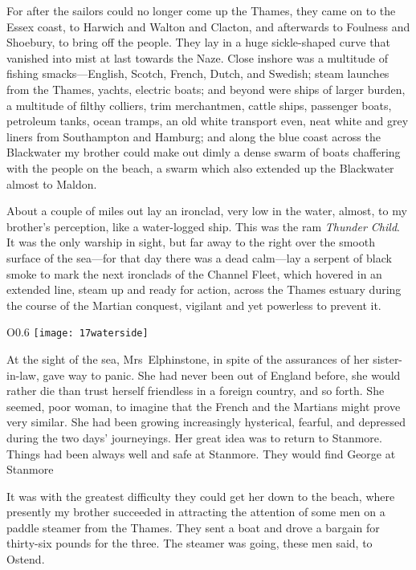 For after the sailors could no longer come up the Thames, they came on to the Essex coast, to Harwich and Walton and Clacton, and afterwards to Foulness and Shoebury, to bring off the people. They lay in a huge sickle-shaped curve that vanished into mist at last towards the Naze. Close inshore was a multitude of fishing smacks—English, Scotch, French, Dutch, and Swedish; steam launches from the Thames, yachts, electric boats; and beyond were ships of larger burden, a multitude of filthy colliers, trim merchantmen, cattle ships, passenger boats, petroleum tanks, ocean tramps, an old white transport even, neat white and grey liners from Southampton and Hamburg; and along the blue coast across the Blackwater my brother could make out dimly a dense swarm of boats chaffering with the people on the beach, a swarm which also extended up the Blackwater almost to Maldon.

About a couple of miles out lay an ironclad, very low in the water, almost, to my brother's perception, like a water-logged ship. This was the ram \textit{Thunder Child}. It was the only warship in sight, but far away to the right over the smooth surface of the sea—for that day there was a dead calm—lay a serpent of black smoke to mark the next ironclads of the Channel Fleet, which hovered in an extended line, steam up and ready for action, across the Thames estuary during the course of the Martian conquest, vigilant and yet powerless to prevent it.

\begin{wrapfigure}{O}{0.6\textwidth}
\centering
\texttt{[image: 17waterside]}
\end{wrapfigure}



At the sight of the sea, Mrs~Elphinstone, in spite of the assurances of her sister-in-law, gave way to panic. She had never been out of England before, she would rather die than trust herself friendless in a foreign country, and so forth. She seemed, poor woman, to imagine that the French and the Martians might prove very similar. She had been growing increasingly hysterical, fearful, and depressed during the two days' journeyings. Her great idea was to return to Stanmore. Things had been always well and safe at Stanmore. They would find George at Stanmore\textellipsis

It was with the greatest difficulty they could get her down to the beach, where presently my brother succeeded in attracting the attention of some men on a paddle steamer from the Thames. They sent a boat and drove a bargain for thirty-six pounds for the three. The steamer was going, these men said, to Ostend.

